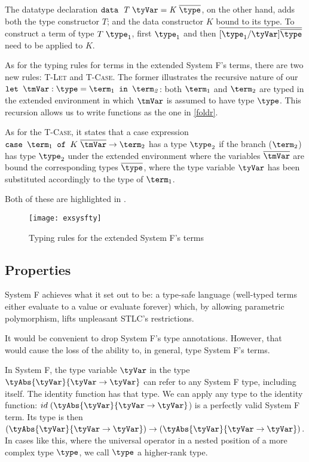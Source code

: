 The datatype declaration $\mathit{\texttt{data } T\; \tyVar = K \;\overline{\type}}$, on the other hand, adds both the type constructor $T$; and the data constructor $K$ bound to its type. To construct a term of type $T\;\type_1$, first $\type_1$ and then $\overline{[\type_1/\tyVar]\overline{\type}}$ need to be applied to $K$.

As for the typing rules for terms in the extended System F's terms, there are two new rules: \textsc{T-Let} and \textsc{T-Case}. The former illustrates the recursive nature of our $\mathit{\texttt{let }} \tmVar : \type = \term_1 \mathit{\texttt{ in }\term_2}$: both $\term_1$ and $\term_2$ are typed in the extended environment in which $\tmVar$ is assumed to have type $\type$. This recursion allows us to write functions as the one in \ref{foldr}.

As for the \textsc{T-Case}, it states that a case expression $\mathit{\texttt{case }} \term_1 \mathit{\texttt{ of }} K \; \overline{\tmVar} \rightarrow \term_2$ has a type $\type_2$ if the branch ($\term_2$) has type $\type_2$ under the extended environment where the variables $\overline{\tmVar}$ are bound the corresponding types $\overline{\type}$, where the type variable $\tyVar$ has been substituted accordingly to the type of $\term_1$.

Both of these are highlighted in .

\begin{figure}
  \texttt{[image: exsysfty]}
    \caption{Typing rules for the extended System F's terms}
  \label{exsysftytm}
\end{figure}

\subsection{Properties}
System F achieves what it set out to be: a type-safe language (well-typed terms either evaluate to a value or evaluate forever) which, by allowing parametric polymorphism, lifts unpleasant STLC's restrictions.

It would be convenient to drop System F's type annotations. However, that would cause the loss of the ability to, in general, type System F's terms.

In System F, the type variable $\tyVar$ in the type $\tyAbs{\tyVar}{\tyVar \rightarrow \tyVar}$ can refer to any System F type, including itself. The identity function has that type. We can apply any type to the identity function: $id\;(\tyAbs{\tyVar}{\tyVar \rightarrow \tyVar}$) is a perfectly valid System F term. Its type is then $(\tyAbs{\tyVar}{\tyVar \rightarrow \tyVar}) \rightarrow (\tyAbs{\tyVar}{\tyVar \rightarrow \tyVar})$. In cases like this, where the universal operator in a nested position of a more complex type $\type$, we call $\type$ a higher-rank type.

